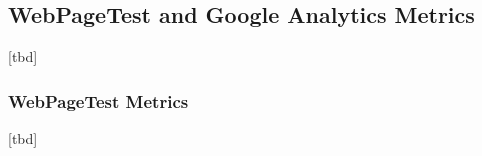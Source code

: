 
\subsection{WebPageTest and Google Analytics Metrics}

[tbd]






\subsubsection{WebPageTest Metrics}

[tbd]













	








